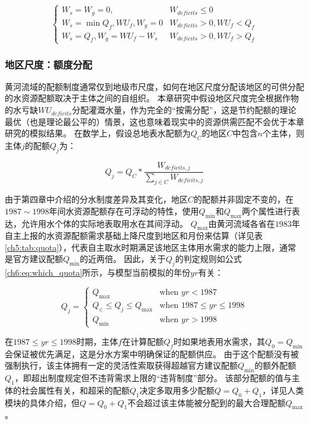 \begin{equation}
    \label{ch6:eq:wu}
    \begin{cases}
        W_s = W_g = 0, & W_{deficits} \leq 0 \\
        W_s = \min{Q_f, WU_f}, W_g = 0 & W_{deficits} > 0, WU_f < Q_f \\
        W_s = Q_f, W_g = WU_f - W_s & W_{deficits} > 0, WU_f > Q_f
    \end{cases}
\end{equation}

\subsubsection{地区尺度：额度分配}

黄河流域的配额制度通常仅到地级市尺度，如何在地区尺度分配该地区的可供分配的水资源配额取决于主体之间的自组织。
本章研究中假设地区尺度完全根据作物的水亏缺$WU_{deficits}$分配灌溉水量，作为完全的“按需分配”，这是节约配额的理论最优（也是理论最公平的）情景，这也意味着现实中的资源供需匹配不会优于本章研究的模拟结果。
在数学上，假设总地表水配额为$Q_{C}$的地区$C$中包含$n$个主体，则主体$j$的配额$Q_j$为：

\begin{equation}
    \label{ch6:eq:quota}
    Q_j = Q_{C} * \frac{W_{deficits, j}}{\sum_{j \in C} W_{deficits, j}}
\end{equation}

由于第四章中介绍的分水制度差异及其变化，地区$C$的配额并非固定不变的，在$1987 \sim 1998$年间水资源配额存在可浮动的特性，使用$Q_{\min}$和$Q_{\max}$两个属性进行表达，允许用水个体的实际地表取用水在其间浮动。
$Q_{\max}$由黄河流域各省在$1983$年自主上报的水资源配额需求基础上降尺度到地区和月份来估算（详见表\ref{ch5:tab:quota}），代表自主取水时期满足该地区主体用水需求的能力上限，通常是官方建议配额$Q_{\min}$的近两倍。
因此，关于$Q_j$的判定规则如公式\ref{ch6:eq:which_quota}所示，与模型当前模拟的年份$yr$有关：

\begin{equation}
    \label{ch6:eq:which_quota}
    Q_j =
    \begin{cases}
        Q_{\max} & \text{when } yr < 1987 \\
        Q_{\in} \leq Q_j \leq Q_{\max} & \text{when } 1987 \leq yr \leq 1998 \\
        Q_{\min} & \text{when } yr > 1998
    \end{cases}
\end{equation}

在$1987 \leq yr \leq 1998$时期，主体$f$在计算配额$Q_f$时如果地表用水需求，其$Q_{0} = Q_{\min}$会保证被优先满足，这是分水方案中明确保证的配额供应。
由于这个配额没有被强制执行，该主体拥有一定的灵活性索取获得超越官方建议配额$Q_{\min}$的额外配额$Q_{1}$，即超出制度规定但不违背需求上限的“违背制度”部分。
该部分配额的值与主体的社会属性有关，和超采的配额$Q_{1}$决定多取用多少配额$Q = Q_{0} + Q_{1}$，详见人类模块的具体介绍，但$Q = Q_{0} + Q_{1}$不会超过该主体能被分配到的最大合理配额$Q_{\max}$。

